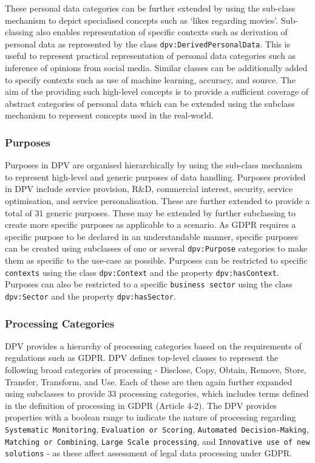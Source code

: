 These personal data categories can be further extended by using the sub-class mechanism to depict specialised concepts such as `likes regarding movies'.
Sub-classing also enables representation of specific contexts such as derivation of personal data as represented by the class \texttt{dpv:DerivedPersonalData}.
This is useful to represent practical representation of personal data categories such as inference of opinions from social media.
Similar classes can be additionally added to specify contexts such as use of machine learning, accuracy, and source.
The aim of the providing such high-level concepts is to provide a sufficient coverage of abstract categories of personal data which can be extended using the subclass mechanism to represent concepts used in the real-world. 

\subsubsection{Purposes}
Purposes in DPV are organised hierarchically by using the sub-class mechanism to represent high-level and generic purposes of data handling.
Purposes provided in DPV include service provision, R\&D, commercial interest, security, service optimisation, and service personalisation. These are further extended to provide a total of 31 generic purposes.
These may be extended by further subclassing to create more specific purposes as applicable to a scenario.
As GDPR requires a specific purpose to be declared in an understandable manner, specific purposes can be created using subclasses of one or several \texttt{dpv:Purpose} categories to make them as specific to the use-case as possible.
 Purposes can be restricted to specific \texttt{contexts} using the class \texttt{dpv:Context} and the property \texttt{dpv:hasContext}.
Purposes can also be restricted to a specific \texttt{business sector} using the class \texttt{dpv:Sector} and the property \texttt{dpv:hasSector}.

\subsubsection{Processing Categories}
DPV provides a hierarchy of processing categories based on the requirements of regulations such as GDPR. 
DPV defines top-level classes to represent the following broad categories of processing - Disclose, Copy, Obtain, Remove, Store, Transfer, Transform, and Use.
Each of these are then again further expanded using subclasses to provide 33 processing categories, which includes terms defined in the definition of processing in GDPR (Article 4-2).
The DPV provides properties with a boolean range to indicate the nature of processing regarding \texttt{Systematic Monitoring}, \texttt{Evaluation or Scoring}, \texttt{Automated Decision-Making}, \texttt{Matching or Combining}, \texttt{Large Scale processing}, and \texttt{Innovative use of new solutions} - as these affect assessment of legal data processing under GDPR.

